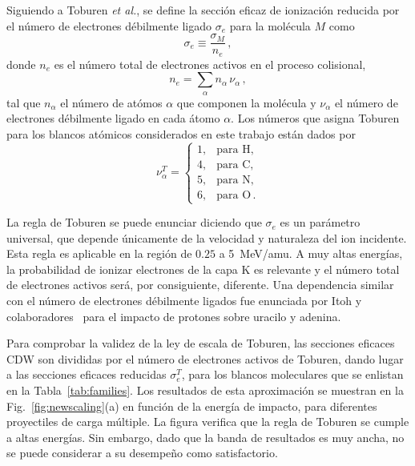 Siguiendo a Toburen \textit{et al.}, se define la sección eficaz de 
ionización reducida por el número de electrones débilmente ligado 
$\sigma_e$ para la molécula $M$ como
\begin{equation}
\sigma_e\equiv\frac{\sigma_M}{n_e}\,, 
\label{eq:cross-ne} 
\end{equation}
donde $n_e$ es el número total de electrones activos en el proceso 
colisional, 
\begin{equation}
n_e=\sum_{\alpha}n_{\alpha}\,\nu_{\alpha}\,,
\end{equation} 
tal que $n_{\alpha}$ el número de atómos $\alpha$ que componen la 
molécula y $\nu_{\alpha}$ el número de electrones débilmente ligado en 
cada átomo $\alpha$. Los números que asigna Toburen para los blancos 
atómicos considerados en este trabajo están dados por 
\begin{equation}
\nu_{\alpha}^T=\left\{ 
\begin{array}{ll}
1, & \text{para H,} \\
4, & \text{para C,} \\ 
5, & \text{para N,} \\ 
6, & \text{para O}\,.
\end{array}\right.
\label{eq:neToburen} 
\end{equation} 

La regla de Toburen se puede enunciar diciendo que $\sigma_{e}$ es un 
parámetro universal, que depende únicamente de la velocidad y naturaleza
del ion incidente. Esta regla es aplicable en la región de $0.25$ a 
5~MeV/amu. A muy altas energías, la probabilidad de ionizar electrones 
de la capa K es relevante y el número total de electrones activos será, 
por consiguiente, diferente. Una dependencia similar con el número de 
electrones débilmente ligados fue enunciada por Itoh y 
colaboradores~\cite{itoh2013} 
para el impacto de protones sobre uracilo y adenina.

Para comprobar la validez de la ley de escala de Toburen, las secciones 
eficaces CDW son divididas por el número de electrones activos de 
Toburen, dando lugar a las secciones eficaces reducidas $\sigma_{e}^T$, 
para los blancos moleculares que se enlistan en la 
Tabla~\ref{tab:families}. Los resultados de esta aproximación se 
muestran en la Fig.~\ref{fig:newscaling}(a) en función de la energía de 
impacto, para diferentes proyectiles de carga múltiple. La figura 
verifica que la regla de Toburen se cumple a altas energías. Sin 
embargo, dado que la banda de resultados es muy ancha, no se puede 
considerar a su desempeño como satisfactorio.

